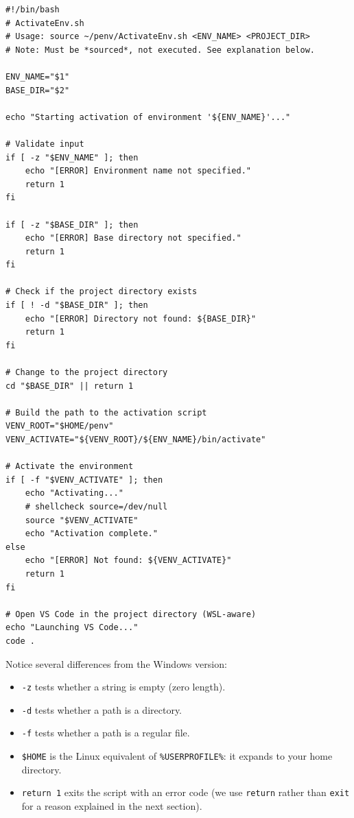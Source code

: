 \begin{lstlisting}[style=linuxStyle, basicstyle=\footnotesize\ttfamily, caption={\texttt{ActivateEnv.sh}: Reusable environment launcher (Linux/WSL)}]
#!/bin/bash
# ActivateEnv.sh
# Usage: source ~/penv/ActivateEnv.sh <ENV_NAME> <PROJECT_DIR>
# Note: Must be *sourced*, not executed. See explanation below.

ENV_NAME="$1"
BASE_DIR="$2"

echo "Starting activation of environment '${ENV_NAME}'..."

# Validate input
if [ -z "$ENV_NAME" ]; then
    echo "[ERROR] Environment name not specified."
    return 1
fi

if [ -z "$BASE_DIR" ]; then
    echo "[ERROR] Base directory not specified."
    return 1
fi

# Check if the project directory exists
if [ ! -d "$BASE_DIR" ]; then
    echo "[ERROR] Directory not found: ${BASE_DIR}"
    return 1
fi

# Change to the project directory
cd "$BASE_DIR" || return 1

# Build the path to the activation script
VENV_ROOT="$HOME/penv"
VENV_ACTIVATE="${VENV_ROOT}/${ENV_NAME}/bin/activate"

# Activate the environment
if [ -f "$VENV_ACTIVATE" ]; then
    echo "Activating..."
    # shellcheck source=/dev/null
    source "$VENV_ACTIVATE"
    echo "Activation complete."
else
    echo "[ERROR] Not found: ${VENV_ACTIVATE}"
    return 1
fi

# Open VS Code in the project directory (WSL-aware)
echo "Launching VS Code..."
code .
\end{lstlisting}

Notice several differences from the Windows version:
\begin{itemize}
  \item \texttt{-z} tests whether a string is empty (zero length).
  \item \texttt{-d} tests whether a path is a directory.
  \item \texttt{-f} tests whether a path is a regular file.
  \item \texttt{\$HOME} is the Linux equivalent of
        \texttt{\%USERPROFILE\%}: it expands to your home directory.
  \item \texttt{return 1} exits the script with an error code (we use
        \texttt{return} rather than \texttt{exit} for a reason explained in
        the next section).
\end{itemize}

